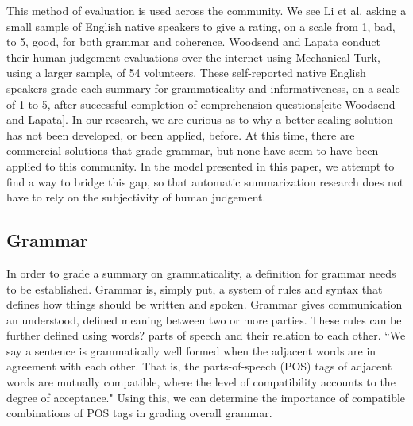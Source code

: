 \documentclass[11pt,a4paper]{article}
\begin{document}
\begin{multicols}{2}
This method of evaluation is used across the community. We see Li et al. asking a small sample of English native speakers to give a rating, on a scale from 1, bad, to 5, good, for both grammar and coherence. Woodsend and Lapata conduct their human judgement evaluations over the internet using Mechanical Turk, using a larger sample, of 54 volunteers. These self-reported native English speakers grade each summary for grammaticality and informativeness, on a scale of 1 to 5, after successful completion of comprehension questions[cite Woodsend and Lapata]. In our research, we are curious as to why a better scaling solution has not been developed, or been applied, before. At this time, there are commercial solutions that grade grammar, but none have seem to have been applied to this community. In the model presented in this paper, we attempt to find a way to bridge this gap, so that automatic summarization research does not have to rely on the subjectivity of human judgement.


\subsection{Grammar}
In order to grade a summary on grammaticality, a definition for grammar needs to be established. Grammar is, simply put, a system of rules and syntax that defines how things should be written and spoken. Grammar gives communication an understood, defined
meaning between two or more parties. These rules can be further defined using words? parts of speech and their relation to each other. ``We say a sentence is grammatically well formed when the adjacent words are in agreement with each other. That is, the parts-of-speech (POS) tags of adjacent words are mutually compatible, where the level of compatibility accounts to the degree of acceptance." \cite{vadlapudi2010} Using this, we can determine the importance of compatible combinations of POS tags in grading overall grammar.



\end{multicols}
\end{document}
